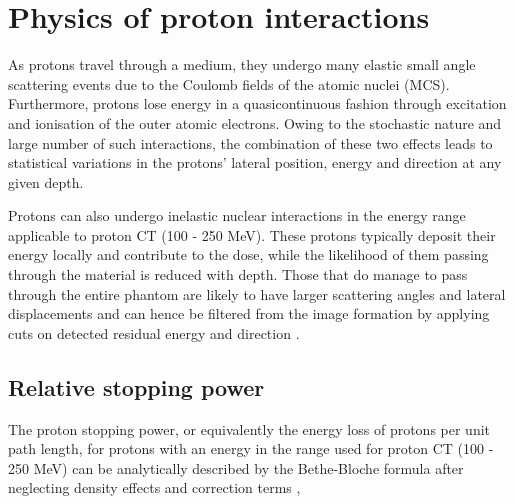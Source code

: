 \documentclass[11pt,a4paper]{article}
\begin{document}

\section{Physics of proton interactions}
As protons travel through a medium, they undergo many elastic small angle scattering events due to the Coulomb fields of the atomic nuclei (MCS). Furthermore, protons lose energy in a quasicontinuous fashion through excitation and ionisation of the outer atomic electrons. Owing to the stochastic nature and large number of such interactions, the combination of these two effects leads to statistical variations in the protons' lateral position, energy and direction at any given depth.

Protons can also undergo inelastic nuclear interactions in the energy range applicable to proton CT (100 - 250 MeV). These protons typically deposit their energy locally and contribute to the dose, while the likelihood of them passing through the material is reduced with depth. Those that do manage to pass through the entire phantom are likely to have larger scattering angles and lateral displacements and can hence be filtered from the image formation by applying cuts on detected residual energy and direction \parencite{schulte2005density}.

\subsection{Relative stopping power}
\label{sec:RSP}
The proton stopping power, or equivalently the energy loss of protons per unit path length, for protons with an energy in the range used for proton CT (100 - 250 MeV) can be analytically described by the Bethe-Bloche formula after neglecting density effects and correction terms \parencite{nakamura2010review},
\end{document}
